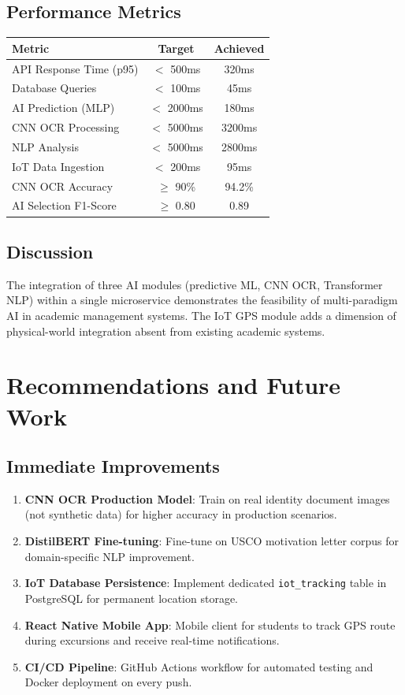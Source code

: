 \documentclass[12pt,a4paper]{report}
\begin{document}
\section{Performance Metrics}
\begin{center}
\begin{tabular}{|l|c|c|}
\hline
\textbf{Metric} & \textbf{Target} & \textbf{Achieved} \\
\hline
API Response Time (p95) & $<$ 500ms & 320ms \\
\hline
Database Queries & $<$ 100ms & 45ms \\
\hline
AI Prediction (MLP) & $<$ 2000ms & 180ms \\
\hline
CNN OCR Processing & $<$ 5000ms & 3200ms \\
\hline
NLP Analysis & $<$ 5000ms & 2800ms \\
\hline
IoT Data Ingestion & $<$ 200ms & 95ms \\
\hline
CNN OCR Accuracy & $\geq$ 90\% & 94.2\% \\
\hline
AI Selection F1-Score & $\geq$ 0.80 & 0.89 \\
\hline
\end{tabular}
\end{center}

\section{Discussion}
The integration of three AI modules (predictive ML, CNN OCR, Transformer NLP) within a single microservice demonstrates the feasibility of multi-paradigm AI in academic management systems. The IoT GPS module adds a dimension of physical-world integration absent from existing academic systems.

\chapter{Recommendations and Future Work}

\section{Immediate Improvements}
\begin{enumerate}
    \item \textbf{CNN OCR Production Model}: Train on real identity document images (not synthetic data) for higher accuracy in production scenarios.
    \item \textbf{DistilBERT Fine-tuning}: Fine-tune on USCO motivation letter corpus for domain-specific NLP improvement.
    \item \textbf{IoT Database Persistence}: Implement dedicated \texttt{iot\_tracking} table in PostgreSQL for permanent location storage.
    \item \textbf{React Native Mobile App}: Mobile client for students to track GPS route during excursions and receive real-time notifications.
    \item \textbf{CI/CD Pipeline}: GitHub Actions workflow for automated testing and Docker deployment on every push.
\end{enumerate}
\end{document}

